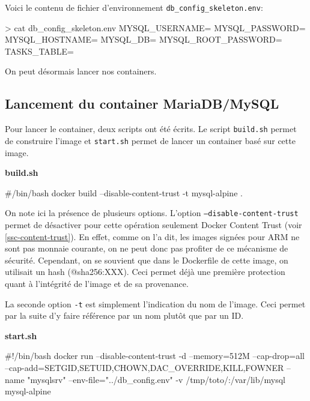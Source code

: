 \documentclass[11pt,a4paper,oneside]{report}
\newcommand{\code}[1]{\texttt{#1}}
\begin{document}
Voici le contenu de fichier d'environnement \code{db\_config\_skeleton.env}:
\begin{bashcode}
> cat db_config_skeleton.env
MYSQL_USERNAME=
MYSQL_PASSWORD=
MYSQL_HOSTNAME=
MYSQL_DB=
MYSQL_ROOT_PASSWORD=
TASKS_TABLE=
\end{bashcode}

On peut désormais lancer nos containers.

\subsection{Lancement du container MariaDB/MySQL}
Pour lancer le container, deux scripts ont été écrits. Le script \code{build.sh} permet de construire l'image et \code{start.sh} permet de lancer un container basé sur cette image.

\textbf{build.sh}
\begin{bashcode}
#/bin/bash
docker build --disable-content-trust -t mysql-alpine . 
\end{bashcode}

On note ici la présence de plusieurs options. L'option \code{--disable-content-trust} permet de désactiver pour cette opération seulement Docker Content Trust (voir \ref{ssc-content-trust}). En effet, comme on l'a dit, les images signées pour ARM ne sont pas monnaie courante, on ne peut donc pas profiter de ce mécanisme de sécurité. Cependant, on se souvient que dans le Dockerfile de cette image, on utilisait un hash (@sha256:XXX). Ceci permet déjà une première protection quant à l'intégrité de l'image et de sa provenance.

La seconde option \code{-t} est simplement l'indication du nom de l'image. Ceci permet par la suite d'y faire référence par un nom plutôt que par un ID.

\textbf{start.sh}
\begin{bashcode}
#!/bin/bash
docker run --disable-content-trust -d --memory=512M --cap-drop=all --cap-add={SETGID,SETUID,CHOWN,DAC_OVERRIDE,KILL,FOWNER} --name "mysqlsrv" --env-file="../db_config.env" -v /tmp/toto/:/var/lib/mysql mysql-alpine
\end{bashcode}
\end{document}
